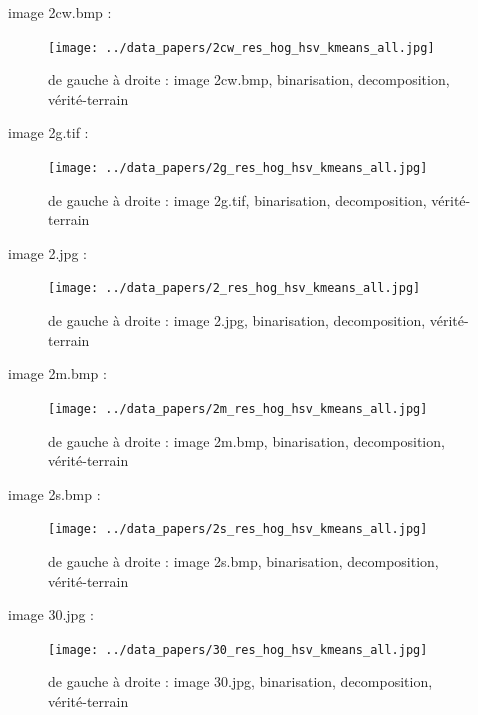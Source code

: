 \documentclass{book}
\begin{document}
image 2cw.bmp : 
\begin{figure}[H]
\begin{center}
\texttt{[image: ../data\_papers/2cw\_res\_hog\_hsv\_kmeans\_all.jpg]}
\end{center}
\caption{de gauche à droite : image 2cw.bmp, binarisation, decomposition, vérité-terrain}
\label{2cw}
\end{figure}
\clearpage


image 2g.tif : 
\begin{figure}[H]
\begin{center}
\texttt{[image: ../data\_papers/2g\_res\_hog\_hsv\_kmeans\_all.jpg]}
\end{center}
\caption{de gauche à droite : image 2g.tif, binarisation, decomposition, vérité-terrain}
\label{2g}
\end{figure}
\clearpage


image 2.jpg : 
\begin{figure}[H]
\begin{center}
\texttt{[image: ../data\_papers/2\_res\_hog\_hsv\_kmeans\_all.jpg]}
\end{center}
\caption{de gauche à droite : image 2.jpg, binarisation, decomposition, vérité-terrain}
\label{2}
\end{figure}
\clearpage


image 2m.bmp : 
\begin{figure}[H]
\begin{center}
\texttt{[image: ../data\_papers/2m\_res\_hog\_hsv\_kmeans\_all.jpg]}
\end{center}
\caption{de gauche à droite : image 2m.bmp, binarisation, decomposition, vérité-terrain}
\label{2m}
\end{figure}
\clearpage


image 2s.bmp : 
\begin{figure}[H]
\begin{center}
\texttt{[image: ../data\_papers/2s\_res\_hog\_hsv\_kmeans\_all.jpg]}
\end{center}
\caption{de gauche à droite : image 2s.bmp, binarisation, decomposition, vérité-terrain}
\label{2s}
\end{figure}
\clearpage


image 30.jpg : 
\begin{figure}[H]
\begin{center}
\texttt{[image: ../data\_papers/30\_res\_hog\_hsv\_kmeans\_all.jpg]}
\end{center}
\caption{de gauche à droite : image 30.jpg, binarisation, decomposition, vérité-terrain}
\label{30}
\end{figure}
\clearpage
\end{document}
